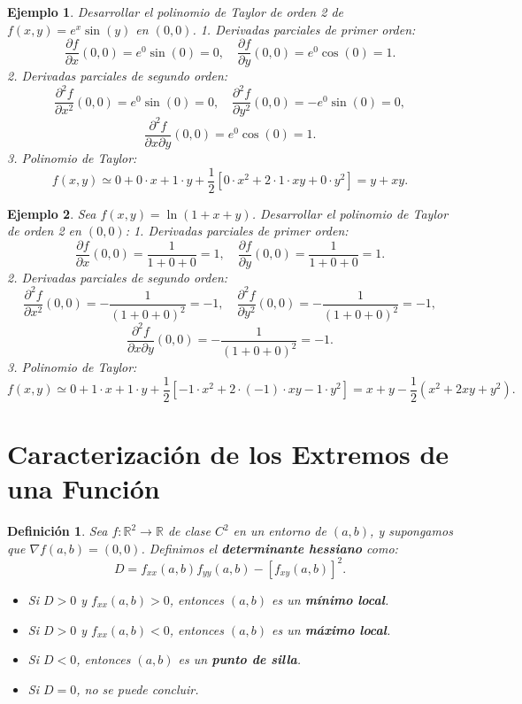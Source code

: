 \documentclass[11pt]{book}
\theoremstyle{definicion}
\newtheorem{definicion}{Definición}[section]
\theoremstyle{teorema}
\theoremstyle{ejemplo}
\newtheorem{ejemplo}{Ejemplo}[section]
\begin{document}

\begin{ejemplo}
Desarrollar el polinomio de Taylor de orden 2 de \( f(x, y) = e^{x} \sin(y) \) en \( (0, 0) \).
1. Derivadas parciales de primer orden:
   \[
   \frac{\partial f}{\partial x}(0, 0) = e^{0} \sin(0) = 0, \quad \frac{\partial f}{\partial y}(0, 0) = e^{0} \cos(0) = 1.
   \]
2. Derivadas parciales de segundo orden:
   \[
   \frac{\partial^2 f}{\partial x^2}(0, 0) = e^{0} \sin(0) = 0, \quad \frac{\partial^2 f}{\partial y^2}(0, 0) = -e^{0} \sin(0) = 0,
   \]
   \[
   \frac{\partial^2 f}{\partial x \partial y}(0, 0) = e^{0} \cos(0) = 1.
   \]
3. Polinomio de Taylor:
   \[
   f(x, y) \simeq 0 + 0 \cdot x + 1 \cdot y + \frac{1}{2} \left[ 0 \cdot x^2 + 2 \cdot 1 \cdot x y + 0 \cdot y^2 \right] = y + xy.
   \]
\end{ejemplo}

\begin{ejemplo}
Sea \( f(x, y) = \ln(1 + x + y) \).
Desarrollar el polinomio de Taylor de orden 2 en \( (0, 0) \):
%
1. Derivadas parciales de primer orden:
   \[
   \frac{\partial f}{\partial x}(0, 0) = \frac{1}{1 + 0 + 0} = 1, \quad \frac{\partial f}{\partial y}(0, 0) = \frac{1}{1 + 0 + 0} = 1.
   \]
%
2. Derivadas parciales de segundo orden:
   \[
   \frac{\partial^2 f}{\partial x^2}(0, 0) = -\frac{1}{(1 + 0 + 0)^2} = -1, \quad \frac{\partial^2 f}{\partial y^2}(0, 0) = -\frac{1}{(1 + 0 + 0)^2} = -1,
   \]
   \[
   \frac{\partial^2 f}{\partial x \partial y}(0, 0) = -\frac{1}{(1 + 0 + 0)^2} = -1.
   \]
%
3. Polinomio de Taylor:
   \[
   f(x, y) \simeq 0 + 1 \cdot x + 1 \cdot y + \frac{1}{2} \left[ -1 \cdot x^2 + 2 \cdot (-1) \cdot x y - 1 \cdot y^2 \right] = x + y - \frac{1}{2}(x^2 + 2xy + y^2).
   \]

\end{ejemplo}



\section{Caracterización de los Extremos de una Función}

\begin{definicion}
    Sea \( f: \mathbb{R}^2 \to \mathbb{R} \) de clase \( C^2 \) en un entorno de \( (a, b) \), y supongamos que \( \nabla f(a, b) = (0, 0) \). Definimos el \textbf{determinante hessiano} como:
    \[
    D = f_{xx}(a, b) f_{yy}(a, b) - [f_{xy}(a, b)]^2.
    \]
    \begin{itemize}
        \item Si \( D > 0 \) y \( f_{xx}(a, b) > 0 \), entonces \( (a, b) \) es un \textbf{mínimo local}.
        \item Si \( D > 0 \) y \( f_{xx}(a, b) < 0 \), entonces \( (a, b) \) es un \textbf{máximo local}.
        \item Si \( D < 0 \), entonces \( (a, b) \) es un \textbf{punto de silla}.
        \item Si \( D = 0 \), no se puede concluir.
    \end{itemize}
\end{definicion}
\end{document}
